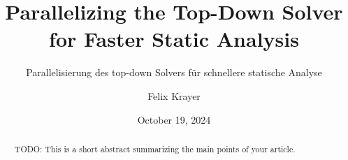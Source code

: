 \documentclass[
  english,        %
  font=times,     %
  twocolumn,      %
]{tumarticle}
\title{Parallelizing the Top-Down Solver for Faster Static Analysis}
\subtitle{Parallelisierung des top-down Solvers für schnellere statische Analyse}
\author[affil=1, email=felix.krayer@tum.de]{Felix Krayer}
\affil[mark=1]{\theUniversityName}
\date{October 19, 2024}
\begin{document}
\maketitle

\begin{abstract}
  TODO: This is a short abstract summarizing the main points of your article.
\end{abstract}









\end{document}
